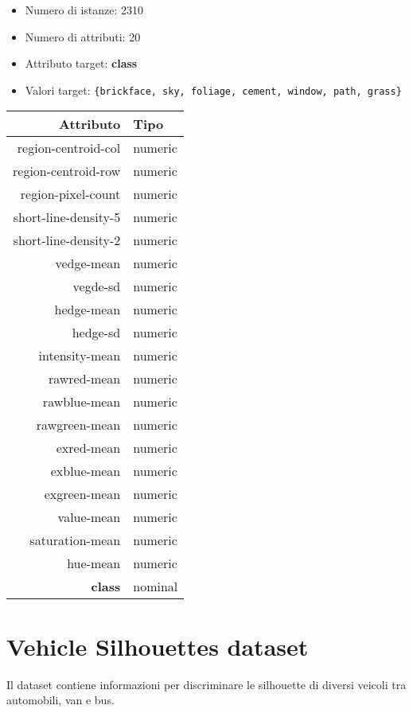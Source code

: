 \begin{itemize}
	\item Numero di istanze: 2310
	\item Numero di attributi: 20
	\item Attributo target: \textbf{class}
	\item Valori target: \texttt{\{brickface, sky, foliage, cement, window, path, grass\}}
\end{itemize}

\begin{table}[!htb]
	\centering
	\begin{tabular}{|r|l|}
		\hline
		Attributo & Tipo \\
		\hline
		region-centroid-col & numeric \\ 
		region-centroid-row & numeric \\ 
		region-pixel-count & numeric \\ 
		short-line-density-5 & numeric \\ 
		short-line-density-2 & numeric \\ 
		vedge-mean & numeric \\ 
		vegde-sd & numeric \\ 
		hedge-mean & numeric \\ 
		hedge-sd & numeric \\ 
		intensity-mean & numeric \\ 
		rawred-mean & numeric \\ 
		rawblue-mean & numeric \\ 
		rawgreen-mean & numeric \\ 
		exred-mean & numeric \\ 
		exblue-mean & numeric \\ 
		exgreen-mean & numeric \\ 
		value-mean & numeric \\ 
		saturation-mean & numeric \\ 
		hue-mean & numeric \\ 
		\textbf{class} & nominal \\ 
		\hline
	\end{tabular}
\end{table}

\pagebreak

\section{Vehicle Silhouettes dataset}

Il dataset contiene informazioni per discriminare le silhouette di diversi veicoli tra automobili, van e bus.

